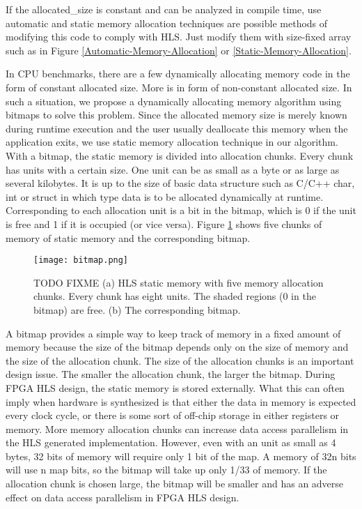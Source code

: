 \documentclass[conference]{IEEEtran}
\begin{document}
If the allocated\_size is constant and can be analyzed in compile time, use automatic and static memory allocation techniques are possible methods of modifying this code to comply with HLS. Just modify them with size-fixed array such as in Figure \ref{Automatic-Memory-Allocation} or  \ref{Static-Memory-Allocation}.

In CPU benchmarks, there are a few dynamically allocating memory code in the form of constant allocated size. More is in form of non-constant allocated size. In such a situation, we propose a dynamically allocating memory algorithm using bitmaps to solve this problem. Since the allocated memory size is merely known during runtime execution and the user usually deallocate this memory when the application exits, we use static memory allocation technique in our algorithm. With a bitmap, the static memory is divided into allocation chunks. Every chunk has units with a certain size. One unit can be as small as a byte or as large as several kilobytes. It is up to the size of basic data structure such as C/C++ char, int or struct in which type data is to be allocated dynamically at runtime. Corresponding to each allocation unit is a bit in the bitmap, which is 0 if the unit is free and 1 if it is occupied (or vice versa). Figure \ref{fig_bitmap} shows five chunks of memory of static memory and the corresponding bitmap.

\begin{figure}[t]\centering
    \texttt{[image: bitmap.png]}\\
    \caption{TODO FIXME (a) HLS static memory with five memory allocation chunks. Every chunk has eight units. The shaded regions (0 in the bitmap) are free. (b) The corresponding bitmap.}    \label{fig_bitmap}
\end{figure}

A bitmap provides a simple way to keep track of memory in a fixed amount of memory because the size of the bitmap depends only on the size of memory and the size of the allocation chunk. The size of the allocation chunks is an important design issue. The smaller the allocation chunk, the larger the bitmap. During FPGA HLS design, the static memory is stored externally. What this can often imply when hardware is synthesized is that either the data in memory is expected every clock cycle, or there is some sort of off-chip storage in either registers or memory. More memory allocation chunks can increase data access parallelism in the HLS generated implementation. However, even with an unit as small as 4 bytes, 32 bits of memory will require only 1 bit of the map. A memory of 32n bits will use n map bits, so the bitmap will take up only 1/33 of memory. If the allocation chunk is chosen large, the bitmap will be smaller and has an adverse effect on data access parallelism in FPGA HLS design.
\end{document}
